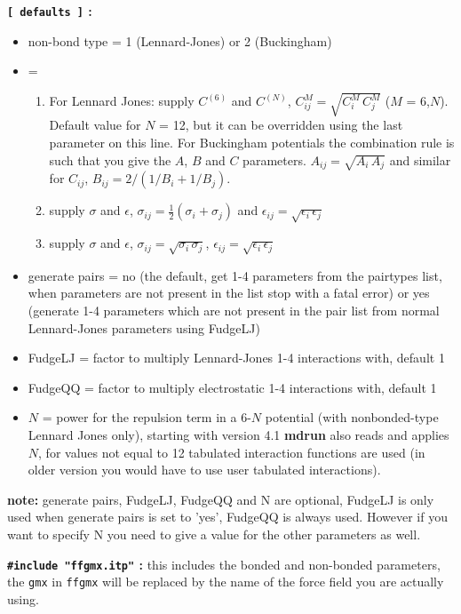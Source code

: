 {\bf {\tt [~defaults~]} :}
\begin{itemize}
\item non-bond type = 1 (Lennard-Jones) or 2 (Buckingham)\\
\item {} = 
\begin{enumerate}
\item For Lennard Jones: supply $C^{(6)}$ and $C^{(N)}$,
$C^{M}_{ij}=\sqrt{C^M_i\,C^M_j}$ ($M$ = 6,$N$).
Default value for $N$ = 12, but it can be
overridden using the last parameter on this line.
For Buckingham potentials the combination rule is such that you give the
$A$, $B$ and $C$ parameters. $A_{ij} = \sqrt{A_i\, A_j}$ and similar for 
$C_{ij}$, $B_{ij} = 2/(1/B_i + 1/B_j)$.
\item supply $\sigma$ and $\epsilon$,
$\sigma_{ij}=\frac{1}{2}(\sigma_i+\sigma_j)$ and 
$\epsilon_{ij}=\sqrt{\epsilon_i\,\epsilon_j}$
\item supply $\sigma$ and $\epsilon$, $\sigma_{ij}=\sqrt{\sigma_i\,\sigma_j}$,
$\epsilon_{ij}=\sqrt{\epsilon_i\,\epsilon_j}$
\end{enumerate}
\item generate pairs = no
(the default, get 1-4 parameters from the pairtypes list, when parameters
are not present in the list stop with a fatal error)
or yes (generate 1-4 parameters which are not present in the pair list
from normal Lennard-Jones parameters using FudgeLJ)
\item FudgeLJ = factor to multiply Lennard-Jones 1-4 interactions with, default 1
\item FudgeQQ = factor to multiply electrostatic 1-4 interactions with, default 1
\item $N$ = power for the repulsion term in a 6-$N$ potential (with 
nonbonded-type Lennard Jones only), starting with {\gromacs} version 4.1
{\bf mdrun} also reads and applies $N$, for values not equal to 12 tabulated
interaction functions are used
(in older version you would have to use user tabulated interactions).
\end{itemize}
{\bf note:} generate pairs, FudgeLJ, FudgeQQ and N are optional,
FudgeLJ is only used when generate pairs is set to 'yes',
FudgeQQ is always used. However if you
want to specify N you need to give a value for the other parameters as well.

%

{\bf {\tt \#include "ffgmx.itp"} :} this includes the bonded and
non-bonded {\gromacs} parameters, the {\tt gmx} in {\tt ffgmx} will be
replaced by the name of the force field you are actually using.

